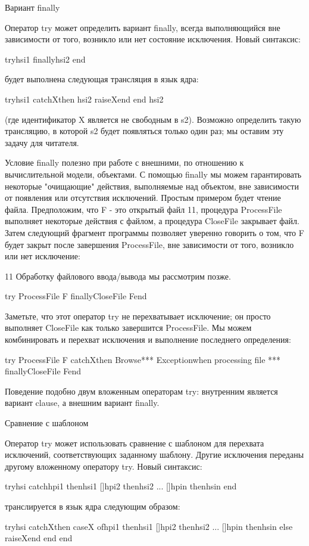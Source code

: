 Вариант finally

Оператор try может определить вариант finally, всегда выполняющийся вне зависимости от того, возникло или нет состояние исключения. Новый синтаксис:

tryhsi1 finallyhsi2 end

будет выполнена следующая трансляция в язык ядра:

tryhsi1
catchXthen
hsi2
raiseXend
end
hsi2

(где идентификатор X является не свободным в s2). Возможно определить такую трансляцию, в которой s2 будет появляться только один раз; мы оставим эту задачу для читателя.

Условие finally полезно при работе с внешними, по отношению к вычислительной модели, объектами. С помощью finally мы можем гарантировать некоторые "очищающие" действия, выполняемые над объектом, вне зависимости от появления или отсутствия исключений. Простым примером будет чтение файла. Предположим, что F - это открытый файл 11, процедура ProcessFile выполняет некоторые действия с файлом, а процедура CloseFile закрывает файл. Затем следующий фрагмент программы позволяет уверенно говорить о том, что F будет закрыт после завершения ProcessFile, вне зависимости от того, возникло или нет исключение:

11 Обработку файлового ввода/вывода мы рассмотрим позже.

try
{ProcessFile F}
finally{CloseFile F}end

Заметьте, что этот оператор try не перехватывает исключение; он просто выполняет CloseFile как только завершится ProcessFile. Мы можем комбинировать и перехват исключения и выполнение последнего определения:

try
{ProcessFile F}
catchXthen
{Browse*** Exceptionwhen processing file ***}
finally{CloseFile F}end

Поведение подобно двум вложенным операторам try: внутренним является вариант clause, а внешним вариант finally.

Сравнение с шаблоном

Оператор try может использовать сравнение с шаблоном для перехвата исключений, соответствующих заданному шаблону. Другие исключения переданы другому вложенному оператору try. Новый синтаксис:

tryhsi
catchhpi1 thenhsi1
[]hpi2 thenhsi2
...
[]hpin thenhsin
end

транслируется в язык ядра следующим образом:

tryhsi
catchXthen
caseX
ofhpi1 thenhsi1
[]hpi2 thenhsi2
...
[]hpin thenhsin
else raiseXend
end
end

